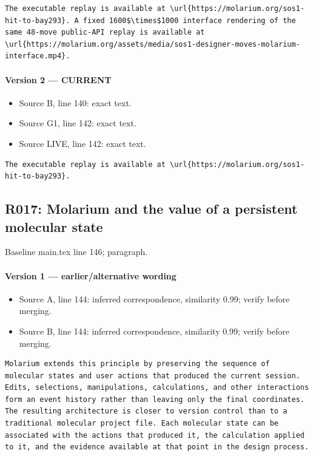 \documentclass[11pt]{article}
\begin{document}
\begin{lstlisting}
The executable replay is available at \url{https://molarium.org/sos1-hit-to-bay293}. A fixed 1600$\times$1000 interface rendering of the same 48-move public-API replay is available at \url{https://molarium.org/assets/media/sos1-designer-moves-molarium-interface.mp4}.
\end{lstlisting}

\paragraph{Version 2 --- CURRENT}

\begin{itemize}[leftmargin=*]
\item Source B, line 140: exact text.
\item Source G1, line 142: exact text.
\item Source LIVE, line 142: exact text.
\end{itemize}

\begin{lstlisting}
The executable replay is available at \url{https://molarium.org/sos1-hit-to-bay293}.
\end{lstlisting}

\subsection{R017: Molarium and the value of a persistent molecular state}

Baseline main.tex line 146; paragraph.

\paragraph{Version 1 --- earlier/alternative wording}

\begin{itemize}[leftmargin=*]
\item Source A, line 144: inferred correspondence, similarity 0.99; verify before merging.
\item Source B, line 144: inferred correspondence, similarity 0.99; verify before merging.
\end{itemize}

\begin{lstlisting}
Molarium extends this principle by preserving the sequence of molecular states and user actions that produced the current session. Edits, selections, manipulations, calculations, and other interactions form an event history rather than leaving only the final coordinates. The resulting architecture is closer to version control than to a traditional molecular project file. Each molecular state can be associated with the actions that produced it, the calculation applied to it, and the evidence available at that point in the design process.
\end{lstlisting}
\end{document}
